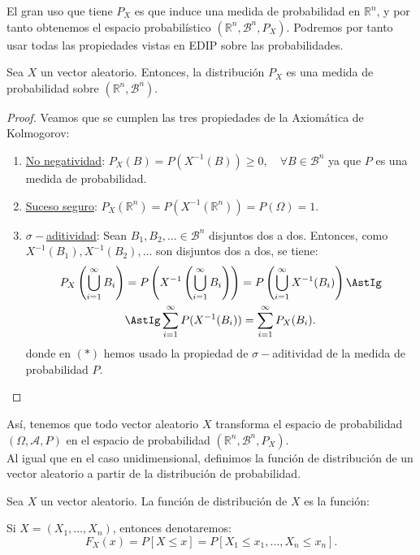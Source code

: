 El gran uso que tiene $P_X$ es que induce una medida de probabilidad en $\mathbb{R}^n$, y por tanto obtenemos el espacio probabilístico $(\mathbb{R}^n, \mathcal{B}^n, P_X)$.
Podremos por tanto usar todas las propiedades vistas en EDIP sobre las probabilidades.
\begin{prop}
    Sea $X$ un vector aleatorio. Entonces, la distribución $P_X$ es una medida de probabilidad sobre $(\mathbb{R}^n, \mathcal{B}^n)$.
\end{prop}
\begin{proof} Veamos que se cumplen las tres propiedades de la Axiomática de Kolmogorov:
    \begin{enumerate}
        \item \ul{No negatividad}: $P_X(B) = P(X^{-1}(B)) \geq 0,\quad \forall B\in \mathcal{B}^n$ ya que $P$ es una medida de probabilidad.
        \item \ul{Suceso seguro}: $P_X(\mathbb{R}^n) = P(X^{-1}(\mathbb{R}^n)) = P(\Omega) = 1$.
        \item \ul{$\sigma-$aditividad}: Sean $B_1, B_2, \ldots \in \mathcal{B}^n$ disjuntos dos a dos. Entonces, como $X^{-1}(B_1), X^{-1}(B_2), \ldots$ son disjuntos dos a dos, se tiene:
        \begin{align*}
            P_X\left(\bigcup_{i=1}^\infty B_i\right) &= P\left(X^{-1}\left(\bigcup_{i=1}^\infty B_i\right)\right) = P\left(\bigcup_{i=1}^\infty X^{-1}(B_i)\right)\AstIg\\
            &\AstIg \sum_{i=1}^\infty P(X^{-1}(B_i)) = \sum_{i=1}^\infty P_X(B_i).
        \end{align*}
        donde en $(\ast)$ hemos usado la propiedad de $\sigma-$aditividad de la medida de probabilidad $P$.\qedhere
    \end{enumerate}
\end{proof}


Así, tenemos que todo vector aleatorio $X$ transforma el espacio de probabilidad $(\Omega, \mathcal{A}, P)$ en el espacio de probabilidad $(\mathbb{R}^n, \mathcal{B}^n, P_X)$.\\

Al igual que en el caso unidimensional, definimos la función de distribución de un vector aleatorio a partir de la distribución de probabilidad.
\begin{definicion}
    Sea $X$ un vector aleatorio. La función de distribución de $X$ es la función:
    \Func{F_X}{\mathbb{R}^n}{[0,1]}{x}{F_X(x) = P_X(\left]-\infty, x\right])}


    Si $X=(X_1, \ldots, X_n)$, entonces denotaremos:
    \begin{equation*}
        F_X(x) = P[X\leq x] = P[X_1\leq x_1, \ldots, X_n\leq x_n].
    \end{equation*}
\end{definicion}

